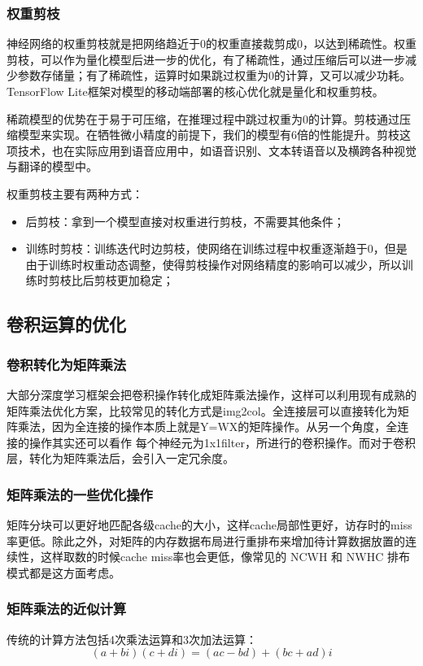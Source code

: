 \documentclass[12pt]{article}
\begin{document}
\subsubsection{权重剪枝}
神经网络的权重剪枝就是把网络趋近于0的权重直接裁剪成0，以达到稀疏性。权重剪枝，可以作为量化模型后进一步的优化，有了稀疏性，通过压缩后可以进一步减少参数存储量；有了稀疏性，运算时如果跳过权重为0的计算，又可以减少功耗。TensorFlow Lite框架对模型的移动端部署的核心优化就是量化和权重剪枝。

稀疏模型的优势在于易于可压缩，在推理过程中跳过权重为0的计算。剪枝通过压缩模型来实现。在牺牲微小精度的前提下，我们的模型有6倍的性能提升。剪枝这项技术，也在实际应用到语音应用中，如语音识别、文本转语音以及横跨各种视觉与翻译的模型中。

权重剪枝主要有两种方式：
\begin{itemize}
\setlength{\itemsep}{0pt}
\setlength{\parsep}{0pt}
\setlength{\parskip}{0pt}
    \item 后剪枝：拿到一个模型直接对权重进行剪枝，不需要其他条件；
    \item 训练时剪枝：训练迭代时边剪枝，使网络在训练过程中权重逐渐趋于0，但是由于训练时权重动态调整，使得剪枝操作对网络精度的影响可以减少，所以训练时剪枝比后剪枝更加稳定；
\end{itemize}

\subsection{卷积运算的优化}
\subsubsection{卷积转化为矩阵乘法}
大部分深度学习框架会把卷积操作转化成矩阵乘法操作，这样可以利用现有成熟的矩阵乘法优化方案，比较常见的转化方式是img2col。全连接层可以直接转化为矩阵乘法，因为全连接的操作本质上就是Y=WX的矩阵操作。从另一个角度，全连接的操作其实还可以看作 每个神经元为1x1filter，所进行的卷积操作。而对于卷积层，转化为矩阵乘法后，会引入一定冗余度。

\subsubsection{矩阵乘法的一些优化操作}
矩阵分块可以更好地匹配各级cache的大小，这样cache局部性更好，访存时的miss率更低。除此之外，对矩阵的内存数据布局进行重排布来增加待计算数据放置的连续性，这样取数的时候cache miss率也会更低，像常见的 NCWH 和 NWHC 排布模式都是这方面考虑。

\subsubsection{矩阵乘法的近似计算}
传统的计算方法包括4次乘法运算和3次加法运算：
$$
(a + bi)(c + di) = (ac - bd) + (bc + ad)i
$$
\end{document}
